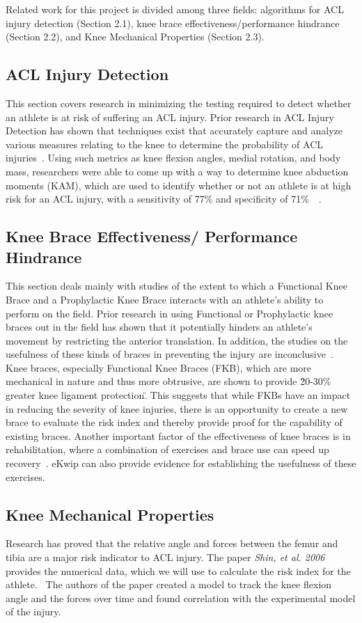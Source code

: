 Related work for this project is divided among three fields: algorithms for ACL injury detection (Section 2.1), knee brace effectiveness/performance hindrance (Section 2.2), and Knee Mechanical Properties (Section 2.3).

\subsection{ACL Injury Detection} This section covers research in minimizing the testing required to detect whether an athlete is at risk of suffering an ACL injury. Prior research in ACL Injury Detection has shown that techniques exist that accurately capture and analyze various measures relating to the knee to determine the probability of ACL injuries~\cite{smedicine}. Using such metrics as knee flexion angles, medial rotation, and body mass, researchers were able to come up with a way to determine knee abduction moments (KAM), which are used to identify whether or not an athlete is at high risk for an ACL injury, with a sensitivity of 77\% and specificity of 71\%~\cite{smedicine}~\cite{Bahr01062005}. 

\subsection{Knee Brace Effectiveness/ Performance Hindrance} This section deals mainly with studies of the extent to which a Functional Knee Brace and a Prophylactic Knee Brace interacts with an athlete's ability to perform on the field. Prior research in using Functional or Prophylactic knee braces out in the field has shown that it potentially hinders an athlete's movement by restricting the anterior translation. In addition, the studies on the usefulness of these kinds of braces in preventing the injury are inconclusive~\cite{Myer01042011}. Knee braces, especially Functional Knee Braces (FKB), which are more mechanical in nature and thus more obtrusive, are shown to provide \"20-30\% greater knee ligament protection\". This suggests that while FKBs have an impact in reducing the severity of knee injuries, there is an opportunity to create a new brace to evaluate the risk index and thereby provide proof for the capability of existing braces. Another important factor of the effectiveness of knee braces is in rehabilitation, where a combination of exercises and brace use can speed up recovery~\cite{hewett2010acl}. eKwip can also provide evidence for establishing the usefulness of these exercises.

\subsection{Knee Mechanical Properties} Research has proved that the relative angle and forces between the femur and tibia are a major risk indicator to ACL injury. The paper \textsl{Shin, et al. 2006} provides the numerical data, which we will use to calculate the risk index for the athlete.~\cite{Shin20071145} The authors of the paper created a model to track the knee flexion angle and the forces over time and found correlation with the experimental model of the injury.
